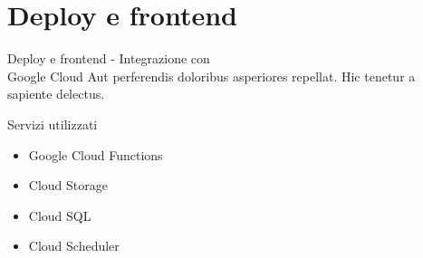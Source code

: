 \documentclass{beamer}
\begin{document}
	\section{Deploy e frontend}

	\begin{frame}{Deploy e frontend - Integrazione con\\ Google Cloud}
		Aut perferendis doloribus asperiores repellat. Hic tenetur a sapiente delectus.

		\begin{block}{Servizi utilizzati}
			\begin{itemize}
				\item Google Cloud Functions
				\item Cloud Storage
				\item Cloud SQL
				\item Cloud Scheduler
			\end{itemize}
		\end{block}
	\end{frame}
\end{document}
